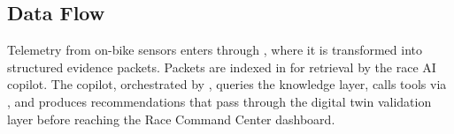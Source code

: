\subsection{Data Flow}

Telemetry from on-bike sensors enters through ,
where it is transformed into structured evidence packets. Packets are indexed
in  for retrieval by the race AI copilot.
The copilot, orchestrated by , queries the knowledge
layer, calls tools via , and produces recommendations that
pass through the digital twin validation layer before reaching the Race Command
Center dashboard.
